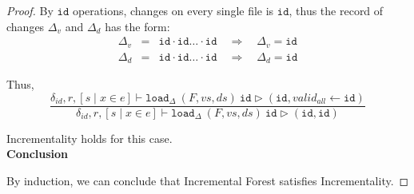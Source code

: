 \documentclass[10pt,twoside,a4paper]{article}
\theoremstyle{theorem}
\theoremstyle{lemma}
\theoremstyle{property}
\theoremstyle{definition}
\theoremstyle{assumption}
\def\id{\mathtt{id}}
\begin{document}
\begin{proof}
	By $\id$ operations, changes on every single file is $\id$, thus the record of changes $\Delta_v$ and $\Delta_d$ has the form:
	\begin{eqnarray*}
		\Delta_v &=& \id \cdot \id \dots \cdot \id \quad \Rightarrow \quad \Delta_v = \id\\
		\Delta_d &=& \id \cdot \id \dots \cdot \id \quad \Rightarrow \quad \Delta_d = \id
	\end{eqnarray*}

	Thus,
	\begin{displaymath}
	\frac
	{\delta_{id}, r, [ s \mid x \in e] \vdash \mathtt{load}_\Delta~ (F,vs,ds)~ \id \rhd (\id, valid_{all} \leftarrow \id)}
	{\delta_{id}, r, [ s \mid x \in e] \vdash \mathtt{load}_\Delta~ (F,vs,ds)~ \id \rhd (\id, \id)}
	\end{displaymath}

	Incrementality holds for this case.\\

	\textbf{Conclusion}

	By induction, we can conclude that Incremental Forest satisfies Incrementality.
\end{proof}
\end{document}
